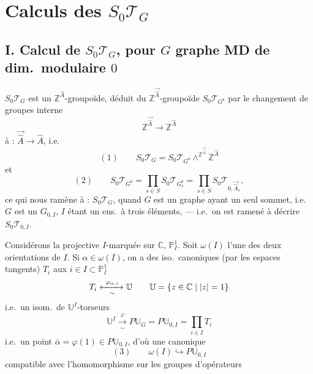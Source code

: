 \documentclass[11pt,a4paper]{article}
\begin{document}
\section{Calculs des $S_0\mathcal{T}_G$}

\subsection{I. Calcul de $S_0\mathcal{T}_G$, pour $G$ graphe MD de dim.\ modulaire $0$}


$S_0\mathcal{T}_G$ est un $\mathbb{Z}^{\hat A}$-groupoïde, déduit du $\mathbb{Z}^{\vec{\hat A}}$-groupoïde $S_0\mathcal{T}_{G^b}$ par le changement de groupes \struck{\ill{}} interne
\[
  \mathbb{Z}^{\vec{\hat A}} \longrightarrow \mathbb{Z}^{\hat A}
\]
 à : $\vec{\hat A} \longrightarrow \hat A$,
i.e.
\[
  (1) \qquad S_0\mathcal{T}_G = S_0\mathcal{T}_{G^b} \wedge^{\mathbb{Z}^{\vec{\hat A}}} \mathbb{Z}^{\hat A}
\]
et
\[
  (2) \qquad S_0\mathcal{T}_{G^b} = \prod_{s\in S} S_0\mathcal{T}_{G^b_s} = \prod_{s\in S} S_0\mathcal{T}_{0,\vec{\hat A}_s} ,
\]
ce qui nous ramène à :  $S_0\mathcal{T}_G$, quand $G$ est un \struck{\ill{}}graphe ayant un seul sommet, i.e.\ $G$ est un $G_{0,I}$, $I$ étant un ens.\ à trois éléments,  --- i.e.\ on est ramené à décrire \struck{\ill{}} $S_0\mathcal{T}_{0,I}$.

Considérons la   projective $I$-marquée sur $\mathbb{C}$, $\mathbb{P}^1_I$. Soit $\omega(I)$ l'une des deux orientations de $I$. Si $\alpha \in \omega(I)$, on a des iso.\ canoniques (par les espaces tangents)  \ill{} $T_i$ aux $i \in I \subset \mathbb{P}^1_I$
\[
  T_i \xleftrightarrow[\ \sim\ ]{\ \varphi_{\alpha,i}\ } \mathbb{U}
  \qquad \mathbb{U} = \{ z \in \mathbb{C} \mid |z| = 1 \}
\]
i.e.\ un isom.\ de $\mathbb{U}^I$-torseurs
\[
  \mathbb{U}^I \xrightarrow[\ \sim\ ]{\ \varphi\ } P\mathbb{U}_G = P\mathbb{U}_{0,I} = \prod_{i\in I} T_i
\]
i.e.\ un point  $\bar\alpha = \varphi(1) \in P\mathbb{U}_{0,I}$, d'où une \struck{\ill{}} canonique
\[
  (3) \qquad \omega(I) \hookrightarrow P\mathbb{U}_{0,I}
\]
compatible avec l'homomorphisme sur les groupes d'opérateurs
\end{document}
